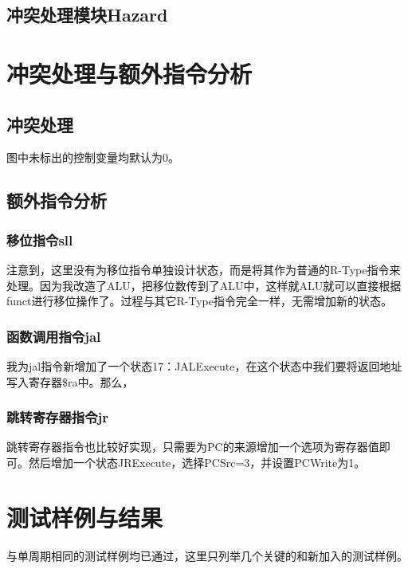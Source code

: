 \documentclass[12pt]{article} %
\begin{document}
\begin{sloppypar}
\subsection{冲突处理模块Hazard}



\newpage
\section{冲突处理与额外指令分析}

\subsection{冲突处理}

图中未标出的控制变量均默认为0。

\subsection{额外指令分析}


\subsubsection{移位指令sll}

注意到，这里没有为移位指令单独设计状态，而是将其作为普通的R-Type指令来处理。因为我改造了ALU，把移位数传到了ALU中，这样就ALU就可以直接根据funct进行移位操作了。过程与其它R-Type指令完全一样，无需增加新的状态。

\subsubsection{函数调用指令jal}

我为jal指令新增加了一个状态17：JALExecute，在这个状态中我们要将返回地址写入寄存器\$ra中。那么，


\subsubsection{跳转寄存器指令jr}

跳转寄存器指令也比较好实现，只需要为PC的来源增加一个选项为寄存器值即可。然后增加一个状态JRExecute，选择PCSrc=3，并设置PCWrite为1。



\newpage
\section{测试样例与结果}

与单周期相同的测试样例均已通过，这里只列举几个关键的和新加入的测试样例。


\end{sloppypar}
\end{document}
